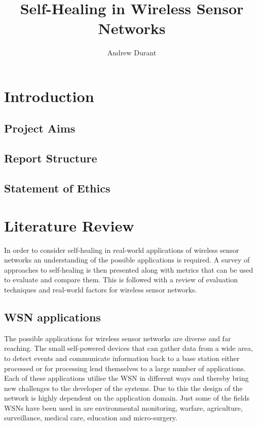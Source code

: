 \documentclass[authoryearcitations]{UoYCSproject}
\author{Andrew Durant}
\title{Self-Healing in Wireless Sensor Networks}
\begin{document}
\maketitle
\listoffigures
\listoftables
\renewcommand*{\lstlistlistingname}{List of Listings}
\lstlistoflistings

\chapter{Introduction}
\label{cha:Introduction}

\section{Project Aims}

\section{Report Structure}

\section{Statement of Ethics}

\chapter{Literature Review}
\label{cha:LitReview}


In order to consider self-healing in real-world applications of wireless sensor networks an understanding of the possible applications is required. A survey of approaches to self-healing is then presented along with metrics that can be used to evaluate and compare them. This is followed with a review of evaluation techniques and real-world factors for wireless sensor networks.

\section{WSN applications}


The possible applications for wireless sensor networks are diverse and far reaching. The small self-powered devices that can gather data from a wide area, to detect events and communicate information back to a base station either processed or for processing lend themselves to a large number of applications. Each of these applications utilise the WSN in different ways and thereby bring new challenges to the developer of the systems. Due to this the design of the network is highly dependent on the application domain. Just some of the fields WSNs have been used in are environmental monitoring, warfare, agriculture, surveillance, medical care, education and micro-surgery.
\end{document}
